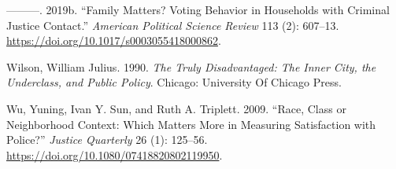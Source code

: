 \documentclass[12pt,]{article}
\begin{document}
\leavevmode\hypertarget{ref-White2019a}{}%
---------. 2019b. ``Family Matters? Voting Behavior in Households with Criminal Justice Contact.'' \emph{American Political Science Review} 113 (2): 607--13. \url{https://doi.org/10.1017/s0003055418000862}.

\leavevmode\hypertarget{ref-Wilson1990}{}%
Wilson, William Julius. 1990. \emph{The Truly Disadvantaged: The Inner City, the Underclass, and Public Policy}. Chicago: University Of Chicago Press.

\leavevmode\hypertarget{ref-Wu2009}{}%
Wu, Yuning, Ivan Y. Sun, and Ruth A. Triplett. 2009. ``Race, Class or Neighborhood Context: Which Matters More in Measuring Satisfaction with Police?'' \emph{Justice Quarterly} 26 (1): 125--56. \url{https://doi.org/10.1080/07418820802119950}.
\end{document}
